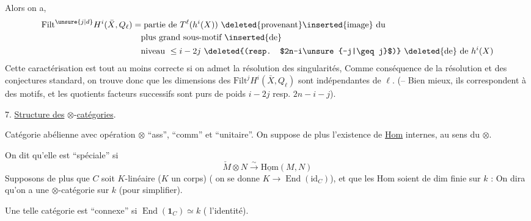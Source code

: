 Alors on a, 
\[
\begin{aligned}
\mathrm{Filt}^{\unsure{j|d}} H^i(\bar X,Q_\ell)&=\text{partie de }T^\ell(h^i(X))\ \text{\deleted{provenant}\inserted{image} du}\\
&\quad\text{plus grand sous-motif \inserted{de}}\\
&\quad\text{niveau }\leq i-2j\ \text{\deleted{(resp. $2n-i\unsure{-j|\geq j}$)} \deleted{de} de }h^i(X)
\end{aligned}
\]
Cette caractérisation  est tout au moins correcte si on admet la résolution des singularités,   Comme conséquence de la résolution et des conjectures standard, on trouve donc que les dimensions des $\mathrm{Filt}^j H^i(\bar X,Q_\ell)$ sont indépendantes de $\ell$. (-- Bien mieux, ils correspondent à des motifs, et les quotients facteurs successifs sont  purs de poids $i-2j$ resp. $2n-i-j$).

7. \uline{Structure des} $\otimes$-\uline{catégories}. 

 Catégorie abélienne avec opération $\otimes$ ``ass'', ``comm'' et ``unitaire''. On suppose de plus l'existence de \uline{Hom} internes, au sens du $\otimes$.

On dit qu'elle est ``spéciale'' si
\[
\check M\otimes N\xrightarrow{\sim}\underline{\mathrm{Hom}}(M,N)
\]
Supposons de plus que $C$ soit $K$-linéaire ($K$ un corps) ( on se donne $K\longrightarrow\operatorname{End}(\mathrm{id}_{C})$), et que les Hom soient de dim finie sur $k$ :  On dira qu'on a une $\otimes$-catégorie sur $k$ (pour simplifier).

Une telle catégorie est  ``connexe'' si $\operatorname{End}(\mathbf{1}_C)\simeq k$ ( l'identité).

